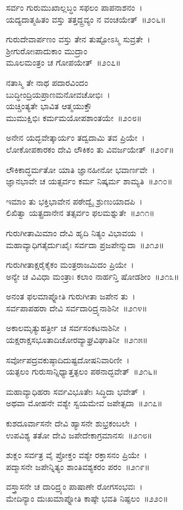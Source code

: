 ಸರ್ವಂ ಗುರುಮುಖಾಲ್ಲಬ್ಧಂ ಸಫಲಂ ಪಾಪನಾಶನಂ~।\\
ಯದ್ಯದಾತ್ಮಹಿತಂ ವಸ್ತು ತತ್ತದ್ದ್ರವ್ಯಂ ನ ವಂಚಯೇತ್~॥೨೦೬॥

ಗುರುದೇವಾರ್ಪಣಂ ವಸ್ತು ತೇನ ತುಷ್ಟೋಽಸ್ಮಿ ಸುವ್ರತೇ~।\\
ಶ್ರೀಗುರೋಃಪಾದುಕಾಂ ಮುದ್ರಾಂ\\ ಮೂಲಮಂತ್ರಂ ಚ ಗೋಪಯೇತ್~॥೨೦೭॥

ನತಾಸ್ಮಿ ತೇ ನಾಥ ಪದಾರವಿಂದಂ\\ ಬುದ್ಧೀಂದ್ರಿಯಪ್ರಾಣಮನೋವಚೋಭಿಃ~।\\
ಯಚ್ಚಿಂತ್ಯತೇ ಭಾವಿತ ಆತ್ಮಯುಕ್ತೌ\\ ಮುಮುಕ್ಷಿಭಿಃ ಕರ್ಮಮಯೋಪಶಾಂತಯೇ~॥೨೦೮॥

ಅನೇನ ಯದ್ಭವೇತ್ಕಾರ್ಯಂ ತದ್ವದಾಮಿ ತವ ಪ್ರಿಯೇ~।\\
ಲೋಕೋಪಕಾರಕಂ ದೇವಿ ಲೌಕಿಕಂ ತು ವಿವರ್ಜಯೇತ್~॥೨೦೯॥

ಲೌಕಿಕಾದ್ಧರ್ಮತೋ ಯಾತಿ ಜ್ಞಾನಹೀನೋ ಭವಾರ್ಣವೇ~।\\
ಜ್ಞಾನಭಾವೇ ಚ ಯತ್ಸರ್ವಂ ಕರ್ಮ ನಿಷ್ಕರ್ಮ ಶಾಮ್ಯತಿ~॥೨೧೦॥

ಇಮಾಂ ತು ಭಕ್ತಿಭಾವೇನ ಪಠೇದ್ವೈ ಶ್ರುಣುಯಾದಪಿ~।\\
ಲಿಖಿತ್ವಾ ಯತ್ಪ್ರದಾನೇನ ತತ್ಸರ್ವಂ ಫಲಮಶ್ನುತೇ~॥೨೧೧॥

ಗುರುಗೀತಾಮಿಮಾಂ ದೇವಿ ಹೃದಿ ನಿತ್ಯಂ ವಿಭಾವಯ~।\\
ಮಹಾವ್ಯಾಧಿಗತೈರ್ದುಃಖೈಃ ಸರ್ವದಾ ಪ್ರಜಪೇನ್ಮುದಾ~॥೨೧೨॥

ಗುರುಗೀತಾಕ್ಷರೈಕೈಕಂ ಮಂತ್ರರಾಜಮಿದಂ ಪ್ರಿಯೇ~।\\
ಅನ್ಯೇ ಚ ವಿವಿಧಾ ಮಂತ್ರಾಃ ಕಲಾಂ ನಾರ್ಹನ್ತಿ ಷೋಡಶೀಂ~॥೨೧೩॥

ಅನಂತ ಫಲಮಾಪ್ನೋತಿ ಗುರುಗೀತಾ ಜಪೇನ ತು~।\\
ಸರ್ವಪಾಪಹರಾ ದೇವಿ ಸರ್ವದಾರಿದ್ರ್ಯನಾಶಿನೀ~॥೨೧೪॥

ಅಕಾಲಮೃತ್ಯುಹರ್ತ್ರೀ ಚ ಸರ್ವಸಂಕಟನಾಶಿನೀ~।\\
ಯಕ್ಷರಾಕ್ಷಸಭೂತಾದಿಚೋರವ್ಯಾಘ್ರವಿಘಾತಿನೀ~॥೨೧೫॥

ಸರ್ವೋಪದ್ರವಕುಷ್ಠಾದಿದುಷ್ಟದೋಷನಿವಾರಿಣೀ~।\\
ಯತ್ಫಲಂ ಗುರುಸಾನ್ನಿಧ್ಯಾತ್ತತ್ಫಲಂ ಪಠನಾದ್ಭವೇತ್~॥೨೧೬॥

ಮಹಾವ್ಯಾಧಿಹರಾ ಸರ್ವವಿಭೂತೇಃ ಸಿದ್ಧಿದಾ ಭವೇತ್~।\\
ಅಥವಾ ಮೋಹನೇ ವಶ್ಯೇ ಸ್ವಯಮೇವ ಜಪೇತ್ಸದಾ~॥೨೧೭॥

ಕುಶದೂರ್ವಾಸನೇ ದೇವಿ ಹ್ಯಾಸನೇ ಶುಭ್ರಕಂಬಲೇ~।\\
ಉಪವಿಶ್ಯ ತತೋ ದೇವಿ ಜಪೇದೇಕಾಗ್ರಮಾನಸಃ~॥೨೧೮॥

ಶುಕ್ಲಂ ಸರ್ವತ್ರ ವೈ ಪ್ರೋಕ್ತಂ ವಶ್ಯೇ ರಕ್ತಾಸನಂ ಪ್ರಿಯೇ~।\\
ಪದ್ಮಾಸನೇ ಜಪೇನ್ನಿತ್ಯಂ ಶಾಂತಿವಶ್ಯಕರಂ ಪರಂ~॥೨೧೯॥

ವಸ್ತ್ರಾಸನೇ ಚ ದಾರಿದ್ರ್ಯಂ ಪಾಷಾಣೇ ರೋಗಸಂಭವಃ~।\\
ಮೇದಿನ್ಯಾಂ ದುಃಖಮಾಪ್ನೋತಿ ಕಾಷ್ಠೇ ಭವತಿ ನಿಷ್ಫಲಂ~॥೨೨೦॥


